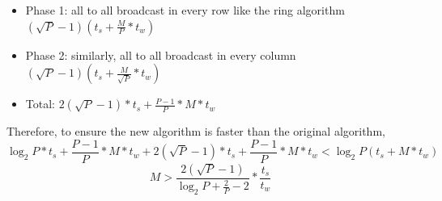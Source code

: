 \documentclass[10pt,letterpaper]{article}
\begin{document}
\begin{enumerate}
\begin{itemize}
\begin{itemize}
\item Phase 1: all to all broadcast in every row like the ring algorithm $(\sqrt{P}-1)(t_s+\frac{M}{P}*t_w)$ \\[5pt]
\item Phase 2: similarly, all to all broadcast in every column $(\sqrt{P}-1)(t_s+\frac{M}{\sqrt{P}}*t_w)$ \\[5pt]
\item Total: $2(\sqrt{P}-1)*t_s+\frac{P-1}{P}*M*t_w$
\end{itemize}
\end{itemize}
Therefore, to ensure the new algorithm is faster than the original algorithm,
\begin{equation*}
\log_2P*t_s+ \frac{P-1}{P}*M*t_w + 2(\sqrt{P}-1)*t_s+\frac{P-1}{P}*M*t_w < \log_2P(t_s+M*t_w)
\end{equation*}
\begin{equation*}
M > \frac{2(\sqrt{P}-1)}{\log_2P+\frac{2}{P}-2}*\frac{t_s}{t_w}
\end{equation*}
\end{enumerate}
\end{document}
